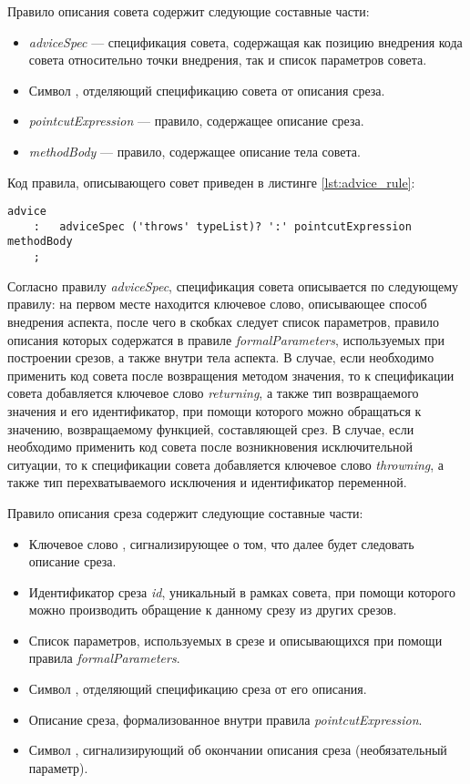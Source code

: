 Правило описания совета содержит следующие составные части:
\begin{itemize}
	\item \textit{adviceSpec} --- спецификация совета, содержащая как позицию
		  внедрения кода совета относительно точки внедрения, так и список
		  параметров совета.
	\item Символ \quotes{:}, отделяющий спецификацию совета от описания среза.
	\item \textit{pointcutExpression} --- правило, содержащее описание среза.
	\item \textit{methodBody} --- правило, содержащее описание тела совета.
\end{itemize}
Код правила, описывающего совет приведен в листинге \ref{lst:advice_rule}:
\begin{lstlisting}[style={java}, label={lst:advice_rule},
  caption={Правило описания совета advice}]
advice
	:	adviceSpec ('throws' typeList)? ':' pointcutExpression methodBody
	;
\end{lstlisting}

Согласно правилу \textit{adviceSpec}, спецификация совета описывается по
следующему правилу: на первом месте находится ключевое слово, описывающее
способ внедрения аспекта, после чего в скобках следует список параметров, правило описания которых содержатся в правиле \textit{formalParameters},
используемых при построении срезов, а также внутри тела аспекта.
В случае, если необходимо применить код совета после возвращения методом
значения, то к спецификации совета добавляется ключевое слово
\textit{returning}, а также тип возвращаемого значения и его идентификатор, при
помощи которого можно обращаться к значению, возвращаемому функцией,
составляющей срез.
В случае, если необходимо применить код совета после возникновения
исключительной ситуации, то к спецификации совета добавляется ключевое слово
\textit{throwning}, а также тип перехватываемого исключения и идентификатор переменной.

Правило описания среза содержит следующие составные части:
\begin{itemize}
	\item Ключевое слово , сигнализирующее о том, что далее
		  будет следовать описание среза.
	\item Идентификатор среза \textit{id}, уникальный в рамках совета, при
		  помощи которого можно производить обращение к данному срезу из других
		  срезов.
	\item Список параметров, используемых в срезе и описывающихся при помощи
		  правила \textit{formalParameters}.
	\item Символ \quotes{:}, отделяющий спецификацию среза от его описания.
	\item Описание среза, формализованное внутри правила
		  \textit{pointcutExpression}.
	\item Символ \quotes{;}, сигнализирующий об окончании описания среза
		  (необязательный параметр).
\end{itemize}

